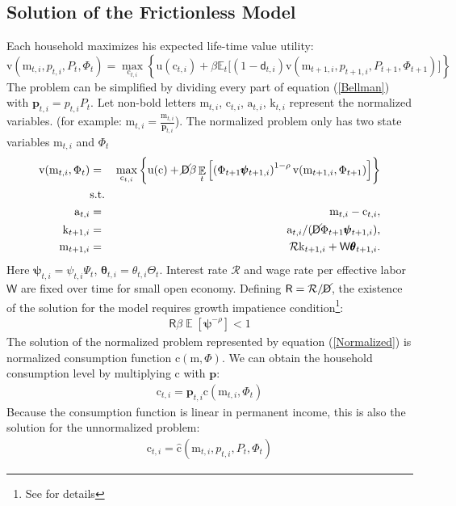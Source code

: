 \documentclass[12pt,letterpaper]{article}
\DeclareMathOperator{\E}{\mathbb{E}}
\begin{document}
\subsection{Solution of the Frictionless Model}
Each household maximizes his expected life-time value utility:
\begin{equation} \label{Bellman}
\mathrm{v}(\pmb{\mathrm{m}}_{t,i},p_{t,i},P_{t},\Phi_t) = \max_{\pmb{\mathrm{c}}_{t,i}} \left\{\mathrm{u}(\pmb{\mathrm{c}}_{t,i}) + \beta \mathbb{E}_{t}\big[(1-\mathsf{d}_{t,i})\mathrm{v}(\pmb{\mathrm{m}}_{t+1,i},p_{t+1,i},P_{t+1},\Phi_{t+1})\big]\right\}
\end{equation}
The problem can be simplified by dividing every part of equation (\ref{Bellman}) with $\pmb{p}_{t,i}=p_{t,i}P_{t}$. Let non-bold letters $\mathrm{m}_{t,i}$, $\mathrm{c}_{t,i}$, $\mathrm{a}_{t,i}$, $\mathrm{k}_{t,i}$ represent the normalized variables. (for example: $\mathrm{m}_{t,i}=\frac{\pmb{\mathrm{m}}_{t,i}}{\pmb{p}_{t,i}}$). The normalized problem only has two state variables $\mathrm{m}_{t,i}$ and $\Phi_{t}$
\begin{eqnarray} \label{Normalized}
\mathrm{v}(\mathrm{m}_{t,i},\Phi_{t}) & = &  \max_{\mathrm{c}_{t,i}}\left\{\mathrm{u}(\mathrm{c})+\cancel{\mathsf{D}}\beta\E_{t}\left[\left(\Phi_{t+1}\pmb{\psi}_{t+1,i}\right)^{1-\rho}\mathrm{v}(\mathrm{m}_{t+1,i},\Phi_{t+1})\right]\right\}
\\  & \mbox{s.t.} & \nonumber
\\   \mathrm{a}_{t,i}   & = & \mathrm{m}_{t,i} - \mathrm{c}_{t,i}, \nonumber
\\   \mathrm{k}_{t+1,i} & = & \mathrm{a}_{t,i} /( \cancel{\mathsf{D}} \Phi_{t+1} \pmb{\psi}_{t+1,i} ),  \nonumber
\\   \mathrm{m}_{t+1,i} & = & \mathcal{R} \mathrm{k}_{t+1,i} + \mathsf{W}\pmb{\theta}_{t+1,i}.  \nonumber
\end{eqnarray}
Here $\pmb{\psi}_{t,i}=\psi_{t,i}\Psi_{t}$, $\pmb{\theta}_{t,i}=\theta_{t,i}\Theta_{t}$. Interest rate $\mathcal{R}$ and wage rate per effective labor $\mathsf{W}$ are fixed over time for small open economy. Defining $\mathsf{R}=\mathcal{R}/\cancel{\mathsf{D}}$, the existence of the solution for the model requires growth impatience condition\footnote{See \cite{BufferTheory} for details}:
\begin{eqnarray}
\mathsf{R}\beta\E\left[\pmb{\psi}^{-\rho}\right]<1
\end{eqnarray}
The solution of the normalized problem represented by equation (\ref{Normalized}) is normalized consumption function $\mathrm{c}(\mathrm{m},\Phi)$. We can obtain the household consumption level by multiplying $\mathrm{c}$ with $\pmb{p}$:
\begin{eqnarray}
\pmb{\mathrm{c}}_{t,i}=\pmb{p}_{t,i}\mathrm{c}(\mathrm{m}_{t,i},\Phi_{t})
\end{eqnarray}
Because the consumption function is linear in permanent income, this is also the solution for the unnormalized problem:
\begin{eqnarray} \label{ConsumptionPolicy}
\pmb{\mathrm{c}}_{t,i}=\hat{\pmb{\mathrm{c}}}(\pmb{\mathrm{m}}_{t,i},p_{t,i},P_{t},\Phi_{t})
\end{eqnarray}
\end{document}
